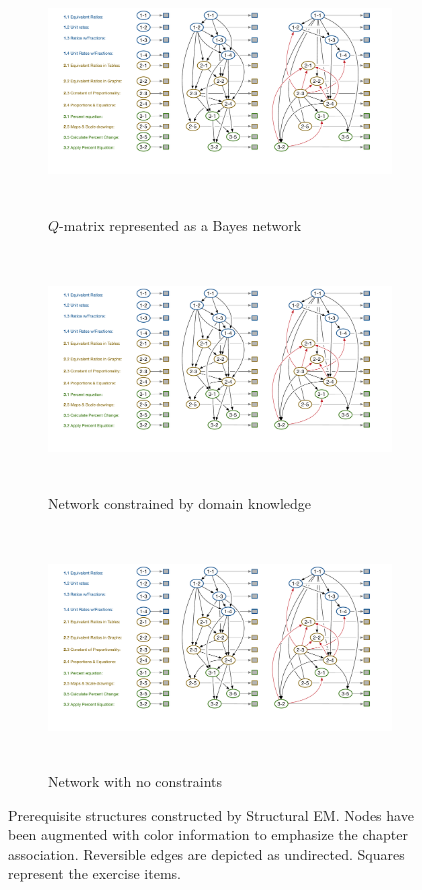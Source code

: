 \documentclass{edm_template}
\begin{document}
{	
	\begin{figure}[tbh]
		\centering
		\begin{subfigure}[t]{0.33\linewidth}
			\centering
			\includegraphics[height=2.5in]{figures/learned_dag_qmatrix.pdf}
			\caption{$Q$-matrix represented as a Bayes network \label{fig:qmatrix}}
		\end{subfigure}
		\begin{subfigure}[t]{0.33\linewidth}
			\centering
			\includegraphics[height=2.5in]{figures/learned_dag_constraint.pdf}
			\caption{Network constrained by domain knowledge \label{fig:constraint}}
		\end{subfigure}
		\begin{subfigure}[t]{0.33\linewidth}
			\centering
			\includegraphics[height=2.5in]{figures/learned_dag_noconstraint.pdf}
			\caption{Network with no constraints \label{fig:noconstraint}}
		\end{subfigure}
		\caption{Prerequisite structures constructed by Structural EM. Nodes have been augmented with color information to emphasize the chapter association. Reversible edges are depicted as undirected. Squares represent the exercise items.\label{fig:prereqmodels} }
	\end{figure}
	
}
\end{document}
